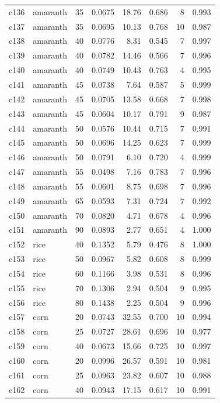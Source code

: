 \begin{longtable}{llrrrrrr}
c136 & amaranth & 35 & 0.0675 & 18.76 & 0.686 & 8 & 0.993 \\
c137 & amaranth & 35 & 0.0695 & 10.13 & 0.768 & 10 & 0.987 \\
c138 & amaranth & 40 & 0.0776 & 8.31 & 0.545 & 7 & 0.997 \\
c139 & amaranth & 40 & 0.0782 & 14.46 & 0.566 & 7 & 0.996 \\
c140 & amaranth & 40 & 0.0749 & 10.43 & 0.763 & 4 & 0.995 \\
c141 & amaranth & 45 & 0.0738 & 7.64 & 0.587 & 5 & 0.999 \\
c142 & amaranth & 45 & 0.0705 & 13.58 & 0.668 & 7 & 0.998 \\
c143 & amaranth & 45 & 0.0604 & 10.17 & 0.791 & 9 & 0.987 \\
c144 & amaranth & 50 & 0.0576 & 10.44 & 0.715 & 7 & 0.991 \\
c145 & amaranth & 50 & 0.0696 & 14.25 & 0.623 & 7 & 0.999 \\
c146 & amaranth & 50 & 0.0791 & 6.10 & 0.720 & 4 & 0.999 \\
c147 & amaranth & 55 & 0.0498 & 7.16 & 0.783 & 7 & 0.996 \\
c148 & amaranth & 55 & 0.0601 & 8.75 & 0.698 & 7 & 0.996 \\
c149 & amaranth & 65 & 0.0593 & 7.31 & 0.724 & 7 & 0.992 \\
c150 & amaranth & 70 & 0.0820 & 4.71 & 0.678 & 4 & 0.996 \\
c151 & amaranth & 90 & 0.0893 & 2.77 & 0.651 & 4 & 1.000 \\
c152 & rice & 40 & 0.1352 & 5.79 & 0.476 & 8 & 1.000 \\
c153 & rice & 50 & 0.0967 & 5.82 & 0.608 & 8 & 0.999 \\
c154 & rice & 60 & 0.1166 & 3.98 & 0.531 & 8 & 0.996 \\
c155 & rice & 70 & 0.1306 & 2.94 & 0.504 & 9 & 0.995 \\
c156 & rice & 80 & 0.1438 & 2.25 & 0.504 & 9 & 0.996 \\
c157 & corn & 20 & 0.0743 & 32.55 & 0.700 & 10 & 0.994 \\
c158 & corn & 25 & 0.0727 & 28.61 & 0.696 & 10 & 0.977 \\
c159 & corn & 40 & 0.0673 & 15.66 & 0.725 & 10 & 0.997 \\
c160 & corn & 20 & 0.0996 & 26.57 & 0.591 & 10 & 0.981 \\
c161 & corn & 25 & 0.0963 & 23.82 & 0.607 & 10 & 0.988 \\
c162 & corn & 40 & 0.0943 & 17.15 & 0.617 & 10 & 0.991 \\

\end{longtable}
